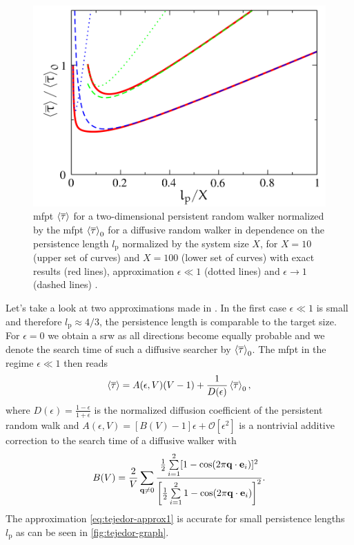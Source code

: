 \begin{figure}[bth]
 \myfloatalign
 \includegraphics[width=0.8\linewidth]{gfx/tejedor-graph}
 \caption[]{\ac{mfpt} $\mfpt[\mean{\tau}]$ for a two-dimensional persistent random walker normalized by the \ac{mfpt} $\mfpt[\mean{\tau}]_0$ for a diffusive random walker in dependence on the persistence length $l_\textrm{p}$ normalized by the system size $X$, for $X = 10$ (upper set of curves) and $X = 100$ (lower set of curves) with exact results (red lines), approximation $\epsilon \ll 1$ (dotted lines) and $\epsilon \rightarrow 1$ (dashed lines) \cite{tejedor:2012}.}\label{fig:tejedor-graph}
\end{figure}

Let's take a look at two approximations made in \cite{tejedor:2012}. In the first case $\epsilon \ll 1$ is small and therefore $l_\textrm{p} \approx 4/3$, \ie the persistence length is comparable to the target size. For $\epsilon = 0$ we obtain a \ac{srw} as all directions become equally probable and we denote the search time of such a diffusive searcher by $\mfpt[\mean{\tau}]_0$. The \ac{mfpt} in the regime $\epsilon \ll 1$ then reads \cite{tejedor:2012}
\begin{equation} \label{eq:tejedor-approx1}
 \mfpt[\mean{\tau}] = A(\epsilon, V) (V - 1) + \frac{1}{D(\epsilon)} \mfpt[\mean{\tau}]_0,
\end{equation}
where $D(\epsilon) = \frac{1-\epsilon}{1+\epsilon}$ is the normalized diffusion coefficient of the persistent random walk and $A(\epsilon, V) = [B(V)-1]\epsilon + \mathcal{O}[\epsilon^2]$ is a nontrivial additive correction to the search time of a diffusive walker with
\begin{equation*}
 B(V) = \frac{2}{V}\sum\limits_{\bv{q}\neq0} \dfrac{\frac{1}{2} \sum\limits_{i=1}^2 [1-\cos(2\pi\bv{q}\cdot\bv{e}_i)]^2}{\left[\frac{1}{2} \sum\limits_{i=1}^2 1-\cos(2\pi\bv{q}\cdot\bv{e}_i)\right]^2}.
\end{equation*}
The approximation \ref{eq:tejedor-approx1} is accurate for small persistence lengths $l_\textrm{p}$ as can be seen in \autoref{fig:tejedor-graph}.

